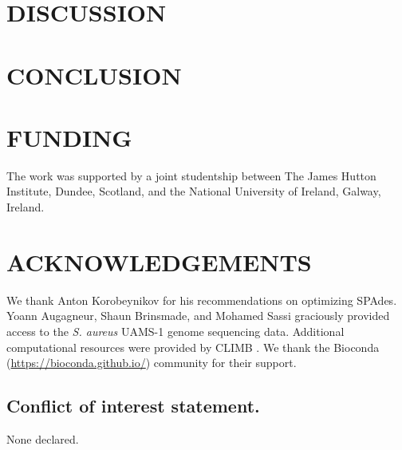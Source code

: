 \documentclass[a4,center,fleqn]{NAR}
\begin{document}



\section*{DISCUSSION}



\section*{CONCLUSION}



\section{FUNDING}
The work was supported by a joint studentship between The James Hutton Institute, Dundee, Scotland, and the National University of Ireland, Galway, Ireland.


\section{ACKNOWLEDGEMENTS}
We thank Anton Korobeynikov for his recommendations on optimizing SPAdes. Yoann Augagneur, Shaun Brinsmade, and Mohamed Sassi graciously provided access to the \textit{S. aureus} UAMS-1 genome sequencing data.  Additional computational resources were provided by CLIMB \cite{Connor2016}. We thank the Bioconda (\url{https://bioconda.github.io/}) community for their support.


\subsection{Conflict of interest statement.}
None declared.



\end{document}
